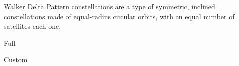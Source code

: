 
Walker Delta Pattern constellations are a type of symmetric, inclined constellations made of equal-radius circular orbits, with an equal number of satellites each one.

{Full}

{Custom}

